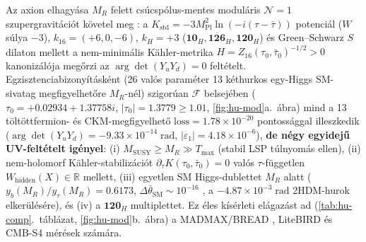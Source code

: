 \documentclass[11pt,a4paper]{article}
\begin{document}
Az axion elhagyása $M_R$ felett csúcspólus-mentes moduláris $\mathcal{N}=1$ szupergravitációt követel meg \cite{Feruglio2019Modular,KaplunovskyLouis1995,ChenRamosSanchezRatz2020,FeruglioStrumiaTitov2023}: a $K_{\mathrm{std}} = -3 M_{\mathrm{Pl}}^2\ln(-i(\tau-\bar{\tau}))$ potenciál ($W$ súlya $-3$), $k_{16} = (+6,0,-6)$, $k_H = +3$ ($\mathbf{10}_H,\overline{\mathbf{126}}_H,\mathbf{120}_H$) és Green--Schwarz $S$ dilaton mellett a nem-minimális Kähler-metrika \cite{ChenRamosSanchezRatz2020} $H = Z_{16}(\tau_0,\bar{\tau}_0)^{-1/2} > 0$ kanonizálója megőrzi az $\arg\det(Y_u Y_d) = 0$ feltételt. Egzisztenciabizonyításként (26 valós paraméter 13 kéthurkos egy-Higgs SM-sivatag megfigyelhetőre $M_R$-nél) szigorúan $\mathcal{F}$ belsejében ($\tau_0 = +0.02934 + 1.37758i$, $|\tau_0| = 1.3779 \ge 1.01$, \ref{fig:hu-mod}a.\ ábra) mind a 13 töltöttfermion- és CKM-megfigyelhető $\mathrm{loss} = 1.78\times 10^{-20}$ pontossággal illeszkedik ($\arg\det(Y_u Y_d) = -9.33\times 10^{-14}\;\mathrm{rad}$, $|\varepsilon_1| = 4.18\times 10^{-6}$), \textbf{de négy egyidejű UV-feltételt igényel}: (i) $M_{\mathrm{SUSY}} \ge M_R \gg T_{\max}$ (stabil LSP túlnyomás ellen), (ii) nem-holomorf Kähler-stabilizációt $\partial_\tau K(\tau_0,\bar{\tau}_0)=0$ valós $\tau$-független $W_{\mathrm{hidden}}(X)\in\mathbb{R}$ mellett, (iii) egyetlen SM Higgs-dublettet $M_R$ alatt ($y_b(M_R)/y_\tau(M_R) = 0.6173$, $\Delta\bar{\theta}_{\mathrm{SM}} \sim 10^{-16}$ \cite{EllisGaillard1979}, a $-4.87\times 10^{-3}\;\mathrm{rad}$ 2HDM-hurok elkerülésére), és (iv) a $\mathbf{120}_H$ multiplettet. Ez éles kísérleti elágazást ad (\ref{tab:hu-comp}.\ táblázat, \ref{fig:hu-mod}b.\ ábra) a MADMAX/BREAD \cite{Caldwell2017MADMAX,Liu2022BREAD}, LiteBIRD és CMB-S4 mérések számára.
\end{document}
